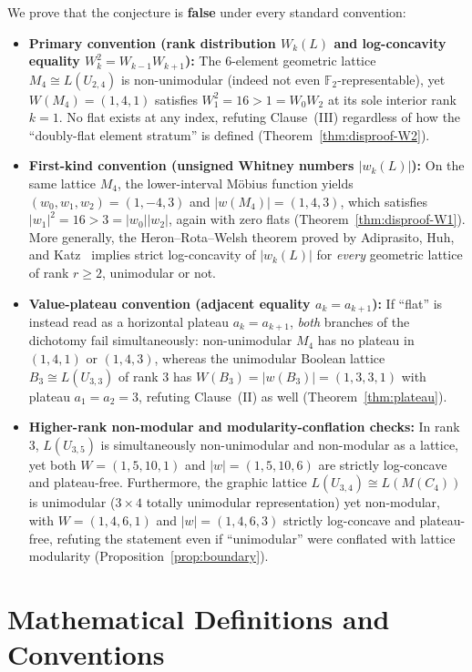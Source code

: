 \documentclass[11pt]{article}
\theoremstyle{definition}
\theoremstyle{remark}
\newcommand{\F}{\mathbb{F}}
\begin{document}
We prove that the conjecture is \textbf{false} under every standard convention:
\begin{itemize}
  \item \textbf{Primary convention (rank distribution $W_k(L)$ and log-concavity equality
    $W_k^2 = W_{k-1} W_{k+1}$):} The $6$-element geometric lattice $M_4 \cong L(U_{2,4})$ is
    non-unimodular (indeed not even $\F_2$-representable), yet $W(M_4) = (1, 4, 1)$ satisfies
    $W_1^2 = 16 > 1 = W_0 W_2$ at its sole interior rank $k = 1$. No flat exists at any index,
    refuting Clause~(III) regardless of how the ``doubly-flat element stratum'' is defined
    (Theorem~\ref{thm:disproof-W2}).
  \item \textbf{First-kind convention (unsigned Whitney numbers $|w_k(L)|$):} On the same lattice
    $M_4$, the lower-interval M\"obius function yields $(w_0, w_1, w_2) = (1, -4, 3)$ and
    $|w(M_4)| = (1, 4, 3)$, which satisfies $|w_1|^2 = 16 > 3 = |w_0||w_2|$, again with zero
    flats (Theorem~\ref{thm:disproof-W1}). More generally, the Heron--Rota--Welsh theorem proved
    by Adiprasito, Huh, and Katz~\cite{AHK2018} implies strict log-concavity of $|w_k(L)|$ for
    \emph{every} geometric lattice of rank $r \ge 2$, unimodular or not.
  \item \textbf{Value-plateau convention (adjacent equality $a_k = a_{k+1}$):} If ``flat'' is
    instead read as a horizontal plateau $a_k = a_{k+1}$, \emph{both} branches of the dichotomy
    fail simultaneously: non-unimodular $M_4$ has no plateau in $(1, 4, 1)$ or $(1, 4, 3)$,
    whereas the unimodular Boolean lattice $B_3 \cong L(U_{3,3})$ of rank $3$ has
    $W(B_3) = |w(B_3)| = (1, 3, 3, 1)$ with plateau $a_1 = a_2 = 3$, refuting Clause~(II)
    as well (Theorem~\ref{thm:plateau}).
  \item \textbf{Higher-rank non-modular and modularity-conflation checks:} In rank $3$,
    $L(U_{3,5})$ is simultaneously non-unimodular and non-modular as a lattice, yet both
    $W = (1, 5, 10, 1)$ and $|w| = (1, 5, 10, 6)$ are strictly log-concave and plateau-free.
    Furthermore, the graphic lattice $L(U_{3,4}) \cong L(M(C_4))$ is unimodular ($3 \times 4$
    totally unimodular representation) yet non-modular, with $W = (1, 4, 6, 1)$ and
    $|w| = (1, 4, 6, 3)$ strictly log-concave and plateau-free, refuting the statement even if
    ``unimodular'' were conflated with lattice modularity (Proposition~\ref{prop:boundary}).
\end{itemize}

\section{Mathematical Definitions and Conventions}
\end{document}
